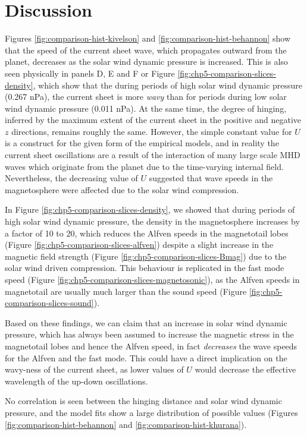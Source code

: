 \section{Discussion}

Figures \ref{fig:comparison-hist-kivelson} and \ref{fig:comparison-hist-behannon} show that the speed of the current sheet wave, which propagates outward from the planet, decreases as the solar wind dynamic pressure is increased. This is also seen physically in panels D, E and F or Figure \ref{fig:chp5-comparison-slices-density}, which show that the during periods of high solar wind dynamic pressure (0.267 nPa), the current sheet is more \emph{wavy} than for periods during low solar wind dynamic pressure (0.011 nPa). At the same time, the degree of hinging, inferred by the maximum extent of the current sheet in the positive and negative $z$ directions, remains roughly the same. However, the simple constant value for $U$ is a construct for the given form of the empirical models, and in reality the current sheet oscillations are a result of the interaction of many large scale MHD waves which originate from the planet due to the time-varying internal field. Nevertheless, the decreasing value of $U$ suggested that wave speeds in the magnetosphere were affected due to the solar wind compression. 

In Figure \ref{fig:chp5-comparison-slices-density}, we showed that during periods of high solar wind dynamic pressure, the density in the magnetosphere increases by a factor of 10 to 20, which reduces the Alfven speeds in the magnetotail lobes (Figure \ref{fig:chp5-comparison-slices-alfven}) despite a slight increase in the magnetic field strength (Figure \ref{fig:chp5-comparison-slices-Bmag}) due to the solar wind driven compression. This behaviour is replicated in the fast mode speed (Figure \ref{fig:chp5-comparison-slices-magnetosonic}), as the Alfven speeds in magnetotail are usually much larger than the sound speed (Figure \ref{fig:chp5-comparison-slices-sound}). 

Based on these findings, we can claim that an increase in solar wind dynamic pressure, which has always been assumed to increase the magnetic stress in the magnetotail lobes and hence the Alfven speed, in fact \emph{decreases} the wave speeds for the Alfven and the fast mode. This could have a direct implication on the wavy-ness of the current sheet, as lower values of $U$ would decrease the effective wavelength of the up-down oscillations. 

No correlation is seen between the hinging distance and solar wind dynamic pressure, and the model fits show a large distribution of possible values (Figures \ref{fig:comparison-hist-behannon} and \ref{fig:comparison-hist-khurana}). 

